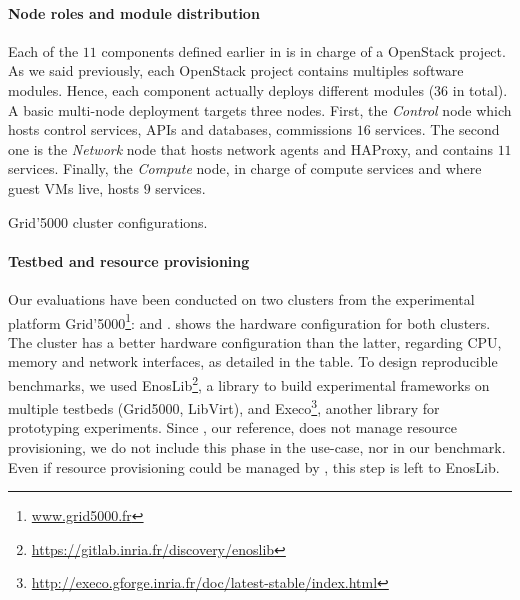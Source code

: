 \paragraph{Node roles and module distribution}
Each of the $11$ components defined earlier in \kolla is in charge of a
OpenStack project. As we said previously, each OpenStack project contains
multiples software modules. Hence, each component actually deploys different
modules ($36$ in total). A basic multi-node \kolla deployment targets three
nodes. First, the \emph{Control} node which hosts control services, APIs and
databases, commissions $16$ services. The second one is the \emph{Network} node
that hosts network agents and HAProxy, and contains $11$ services. Finally, the
\emph{Compute} node, in charge of compute services and where guest VMs live,
hosts $9$ services.

\begin{table}
  \begin{center}
    \small
    
    \caption{Grid'5000 cluster configurations.}
    \label{tab:g5k}
  \end{center}
\end{table}

\paragraph{Testbed and resource provisioning}
Our evaluations have been conducted on two clusters from the experimental
platform Grid'5000\footnote{\url{www.grid5000.fr}}: \ecotype and \nova. \Cref
shows the hardware configuration for both clusters. The cluster \ecotype has a
better hardware configuration than the latter, regarding CPU, memory and network
interfaces, as detailed in the table. To design reproducible benchmarks, we
used EnosLib\footnote{\url{https://gitlab.inria.fr/discovery/enoslib}}, a
library to build experimental frameworks on multiple testbeds (\eg Grid5000,
LibVirt), and
Execo\footnote{\url{http://execo.gforge.inria.fr/doc/latest-stable/index.html}},
another library for prototyping experiments. Since \kolla, our reference, does
not manage resource provisioning, we do not include this phase in the use-case,
nor in our benchmark. Even if resource provisioning could be managed by \mad,
this step is left to EnosLib.

